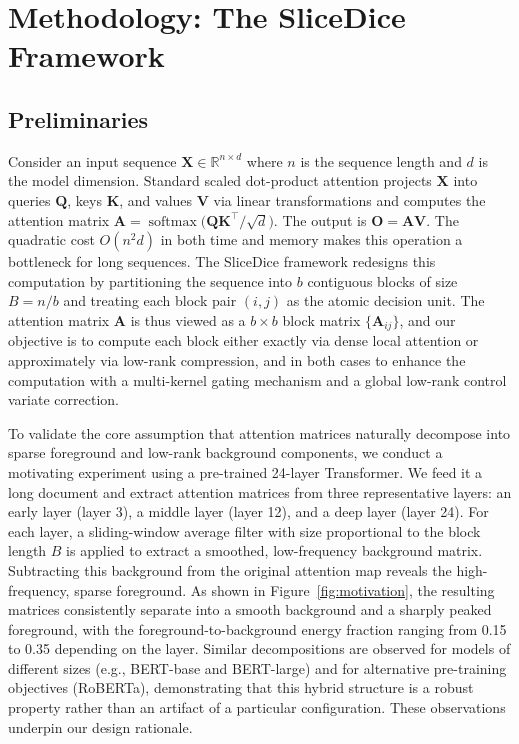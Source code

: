 \documentclass{article}
\begin{document}
\section{Methodology: The SliceDice Framework}
\label{sec:methodology}

\subsection{Preliminaries}

Consider an input sequence $\mathbf{X}\in\mathbb{R}^{n\times d}$ where $n$ is the sequence length and $d$ is the model dimension. Standard scaled dot-product attention projects $\mathbf{X}$ into queries $\mathbf{Q}$, keys $\mathbf{K}$, and values $\mathbf{V}$ via linear transformations and computes the attention matrix $\mathbf{A} = \operatorname{softmax}\big(\mathbf{Q}\mathbf{K}^{\top}/\sqrt{d}\big)$. The output is $\mathbf{O}=\mathbf{A}\mathbf{V}$. The quadratic cost $O(n^{2}d)$ in both time and memory makes this operation a bottleneck for long sequences. The SliceDice framework redesigns this computation by partitioning the sequence into $b$ contiguous blocks of size $B=n/b$ and treating each block pair $(i,j)$ as the atomic decision unit. The attention matrix $\mathbf{A}$ is thus viewed as a $b\times b$ block matrix $\{\mathbf{A}_{ij}\}$, and our objective is to compute each block either exactly via dense local attention or approximately via low-rank compression, and in both cases to enhance the computation with a multi-kernel gating mechanism and a global low-rank control variate correction.

To validate the core assumption that attention matrices naturally decompose into sparse foreground and low-rank background components, we conduct a motivating experiment using a pre-trained 24-layer Transformer. We feed it a long document and extract attention matrices from three representative layers: an early layer (layer 3), a middle layer (layer 12), and a deep layer (layer 24). For each layer, a sliding-window average filter with size proportional to the block length $B$ is applied to extract a smoothed, low-frequency background matrix. Subtracting this background from the original attention map reveals the high-frequency, sparse foreground. As shown in Figure~\ref{fig:motivation}, the resulting matrices consistently separate into a smooth background and a sharply peaked foreground, with the foreground-to-background energy fraction ranging from 0.15 to 0.35 depending on the layer. Similar decompositions are observed for models of different sizes (e.g., BERT-base and BERT-large) and for alternative pre-training objectives (RoBERTa), demonstrating that this hybrid structure is a robust property rather than an artifact of a particular configuration. These observations underpin our design rationale.
\end{document}
